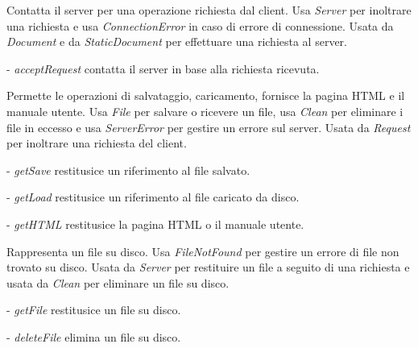 Contatta il server per una operazione richiesta dal client.
Usa \textit{Server} per inoltrare una richiesta e usa \textit{ConnectionError} in caso di errore di connessione.
Usata da \textit{Document} e da \textit{StaticDocument} per effettuare una richiesta al server.
\begin{elencopuntato}[\normindent]
\item[-] \textit{acceptRequest} contatta il server in base alla richiesta ricevuta.
\end{elencopuntato}

Permette le operazioni di salvataggio, caricamento, fornisce la pagina HTML e il manuale utente.
Usa \textit{File} per salvare o ricevere un file, usa \textit{Clean} per eliminare i file in eccesso e usa \textit{ServerError} per gestire un errore sul server.
Usata da \textit{Request} per inoltrare una richiesta del client.
\begin{elencopuntato}[\normindent]
\item[-] \textit{getSave} restitusice un riferimento al file salvato.
\item[-] \textit{getLoad} restitusice un riferimento al file caricato da disco.
\item[-] \textit{getHTML} restitusice la pagina HTML o il manuale utente.
\end{elencopuntato}

Rappresenta un file su disco.
Usa \textit{FileNotFound} per gestire un errore di file non trovato su disco.
Usata da \textit{Server} per restituire un file a seguito di una richiesta e usata da \textit{Clean} per eliminare un file su disco.
\begin{elencopuntato}[\normindent]
\item[-] \textit{getFile} restitusice un file su disco.
\item[-] \textit{deleteFile} elimina un file su disco.
\end{elencopuntato}

